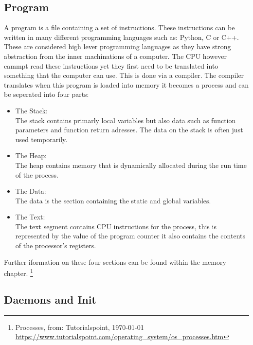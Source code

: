 \subsection{Program}

A program is a file containing a set of instructions. These instructions can be written in many different 
programming languages such as: Python, C or C++. These are considered high lever programming languages as 
they have strong abstraction from the inner machinations of a computer. The CPU however cammpt read these 
instructions yet they first need to be translated into something that the computer can use. This is done 
via a compiler. The compiler translates when this program is loaded into memory it becomes a process and can 
be seperated into four parts:

\begin{itemize}
\item The Stack: \\

The stack contains primarly local variables but also data such as function parameters and function return adresses. The data on the stack is often just used temporarily.
\item The Heap: \\

The heap contains memory that is dynamically allocated during the run time of the process.
\item The Data: \\

The data is the section containing the static and global variables.
\item The Text: \\

The text segment contains CPU instructions for the process, this is represented by the value of the program counter it also contains the contents of the processor's registers.

\end{itemize}

Further iformation on these four sections can be found within the memory chapter. \footnote{Processes, from: Tutorialspoint, \today \\ \url{https://www.tutorialspoint.com/operating_system/os_processes.htm} }


\subsection{Daemons and Init}


